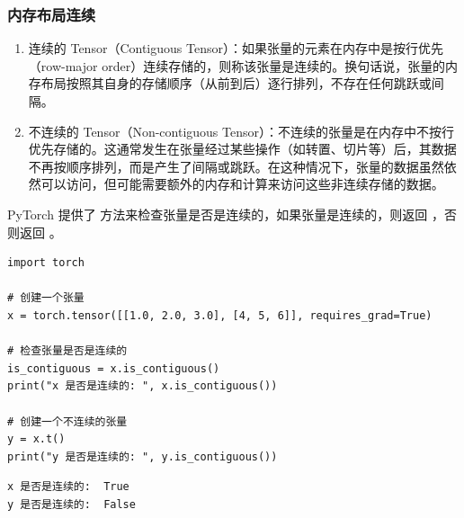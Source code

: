 \subsubsection{内存布局连续}
\label{subsec:Pytorch的内存布局连续}
\begin{enumerate}[label=\arabic*)]
    \item 连续的 Tensor（Contiguous Tensor）：如果张量的元素在内存中是按行优先（row-major order）连续存储的，则称该张量是连续的。换句话说，张量的内存布局按照其自身的存储顺序（从前到后）逐行排列，不存在任何跳跃或间隔。

    \item 不连续的 Tensor（Non-contiguous Tensor）：不连续的张量是在内存中不按行优先存储的。这通常发生在张量经过某些操作（如转置、切片等）后，其数据不再按顺序排列，而是产生了间隔或跳跃。在这种情况下，张量的数据虽然依然可以访问，但可能需要额外的内存和计算来访问这些非连续存储的数据。
\end{enumerate}

PyTorch 提供了  方法来检查张量是否是连续的，如果张量是连续的，则返回 ，否则返回 。
\begin{lstlisting}[style=pythonstyle]
import torch

# 创建一个张量
x = torch.tensor([[1.0, 2.0, 3.0], [4, 5, 6]], requires_grad=True)

# 检查张量是否是连续的
is_contiguous = x.is_contiguous()
print("x 是否是连续的: ", x.is_contiguous())

# 创建一个不连续的张量
y = x.t()
print("y 是否是连续的: ", y.is_contiguous())
\end{lstlisting}
\begin{lstlisting}[style=demostyle,numbers=none]
x 是否是连续的:  True
y 是否是连续的:  False
\end{lstlisting}

